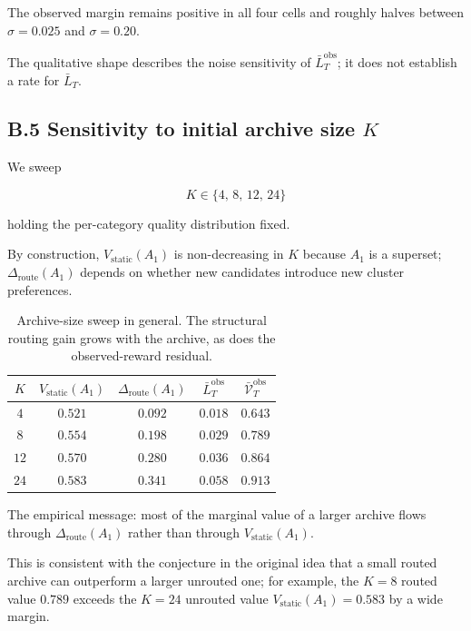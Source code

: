 \documentclass{article} %
\begin{document}
The observed margin remains positive in all four cells and roughly halves
between \(\sigma=0.025\) and \(\sigma=0.20\).

The qualitative shape describes the noise sensitivity of
\(\bar L_T^{\mathrm{obs}}\); it does not establish a rate for \(\bar L_T\).

\subsection{B.5 Sensitivity to initial archive size $K$}

\label{app:K-sweep}

We sweep

\begin{equation}
\label{eq:app-K-grid}
K \in \{4,\, 8,\, 12,\, 24\}
\end{equation}

holding the per-category quality distribution fixed.

By construction, $V_{\mathrm{static}}(A_1)$ is non-decreasing in $K$ because $A_1$ is a superset; $\Delta_{\mathrm{route}}(A_1)$ depends on whether new candidates introduce new cluster preferences.

\begin{table}[h]
\centering
\small
\begin{tabular}{ccccc}
\toprule
$K$ & $V_{\mathrm{static}}(A_1)$ & $\Delta_{\mathrm{route}}(A_1)$ & $\bar L_T^{\mathrm{obs}}$ & $\bar{\mathcal V}_T^{\mathrm{obs}}$ \\
\midrule
$4$  & $0.521$ & $0.092$ & $0.018$ & $0.643$ \\
$8$  & $0.554$ & $0.198$ & $0.029$ & $0.789$ \\
$12$ & $0.570$ & $0.280$ & $0.036$ & $0.864$ \\
$24$ & $0.583$ & $0.341$ & $0.058$ & $0.913$ \\
\bottomrule
\end{tabular}
\caption{Archive-size sweep in general. The structural routing gain grows with
the archive, as does the observed-reward residual.}
\label{tab:app-K-sweep}
\end{table}

The empirical message: most of the marginal value of a larger archive flows through $\Delta_{\mathrm{route}}(A_1)$ rather than through $V_{\mathrm{static}}(A_1)$.

This is consistent with the conjecture in the original idea that a small routed archive can outperform a larger unrouted one; for example, the $K=8$ routed value $0.789$ exceeds the $K=24$ unrouted value $V_{\mathrm{static}}(A_1)=0.583$ by a wide margin.
\end{document}
